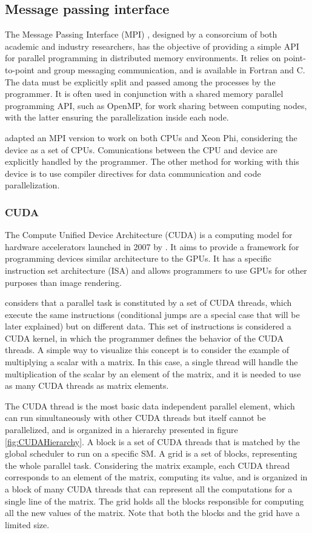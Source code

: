 \subsection*{Message passing interface}
\label{MPI}

The Message Passing Interface (MPI) \cite{MPI}, designed by a consorcium of both academic and industry researchers, has the objective of providing a simple API for parallel programming in distributed memory environments. It relies on point-to-point and group messaging communication, and is available in Fortran and C. The data must be explicitly split and passed among the processes by the programmer. It is often used in conjunction with a shared memory parallel programming API, such as OpenMP, for work sharing between computing nodes, with the latter ensuring the parallelization inside each node.

\intel adapted an MPI version to work on both CPUs and Xeon Phi, considering the device as a set of CPUs. Comunications between the CPU and device are explicitly handled by the programmer. The other method for working with this device is to use compiler directives for data communication and code parallelization.

\subsubsection*{CUDA}
\label{CUDA}

The Compute Unified Device Architecture (CUDA) is a computing model for hardware accelerators launched in 2007 by \nvidia. It aims to provide a framework for programming devices similar architecture to the \nvidia GPUs. It has a specific instruction set architecture (ISA) and allows programmers to use GPUs for other purposes than image rendering.

\nvidia considers that a parallel task is constituted by a set of CUDA threads, which execute the same instructions (conditional jumps are a special case that will be later explained) but on different data. This set of instructions is considered a CUDA kernel, in which the programmer defines the behavior of the CUDA threads. A simple way to visualize this concept is to consider the example of multiplying a scalar with a matrix. In this case, a single thread will handle the multiplication of the scalar by an element of the matrix, and it is needed to use as many CUDA threads as matrix elements.

The CUDA thread is the most basic data independent parallel element, which can run simultaneously with other CUDA threads but itself cannot be parallelized, and is organized in a hierarchy presented in figure \ref{fig:CUDAHierarchy}. A block is a set of CUDA threads that is matched by the global scheduler to run on a specific SM. A grid is a set of blocks, representing the whole parallel task. Considering the matrix example, each CUDA thread corresponds to an element of the matrix, computing its value, and is organized in a block of many CUDA threads that can represent all the computations for a single line of the matrix. The grid holds all the blocks responsible for computing all the new values of the matrix. Note that both the blocks and the grid have a limited size.

